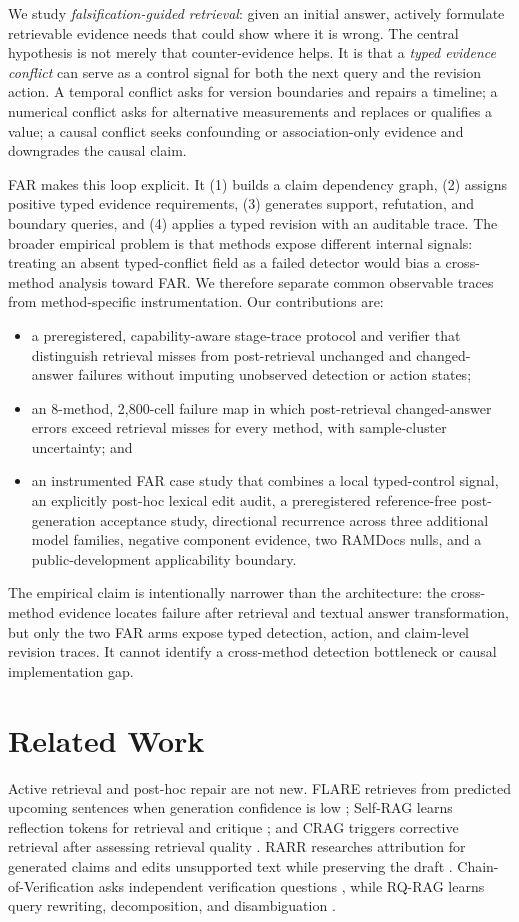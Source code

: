 \documentclass[letterpaper]{article}
\begin{document}
We study \emph{falsification-guided retrieval}: given an initial answer, actively formulate retrievable evidence needs that could show where it is wrong. The central hypothesis is not merely that counter-evidence helps. It is that a \emph{typed evidence conflict} can serve as a control signal for both the next query and the revision action. A temporal conflict asks for version boundaries and repairs a timeline; a numerical conflict asks for alternative measurements and replaces or qualifies a value; a causal conflict seeks confounding or association-only evidence and downgrades the causal claim.

FAR makes this loop explicit. It (1) builds a claim dependency graph, (2) assigns positive typed evidence requirements, (3) generates support, refutation, and boundary queries, and (4) applies a typed revision with an auditable trace. The broader empirical problem is that methods expose different internal signals: treating an absent typed-conflict field as a failed detector would bias a cross-method analysis toward FAR. We therefore separate common observable traces from method-specific instrumentation. Our contributions are:
\begin{itemize}
    \item a preregistered, capability-aware stage-trace protocol and verifier that distinguish retrieval misses from post-retrieval unchanged and changed-answer failures without imputing unobserved detection or action states;
    \item an 8-method, 2,800-cell failure map in which post-retrieval changed-answer errors exceed retrieval misses for every method, with sample-cluster uncertainty; and
    \item an instrumented FAR case study that combines a local typed-control signal, an explicitly post-hoc lexical edit audit, a preregistered reference-free post-generation acceptance study, directional recurrence across three additional model families, negative component evidence, two RAMDocs nulls, and a public-development applicability boundary.
\end{itemize}
The empirical claim is intentionally narrower than the architecture: the cross-method evidence locates failure after retrieval and textual answer transformation, but only the two FAR arms expose typed detection, action, and claim-level revision traces. It cannot identify a cross-method detection bottleneck or causal implementation gap.

\section{Related Work}
Active retrieval and post-hoc repair are not new. FLARE retrieves from predicted upcoming sentences when generation confidence is low \cite{jiang2023flare}; Self-RAG learns reflection tokens for retrieval and critique \cite{asai2024selfrag}; and CRAG triggers corrective retrieval after assessing retrieval quality \cite{yan2024crag}. RARR researches attribution for generated claims and edits unsupported text while preserving the draft \cite{gao2023rarr}. Chain-of-Verification asks independent verification questions \cite{dhuliawala2024cove}, while RQ-RAG learns query rewriting, decomposition, and disambiguation \cite{chan2024rqrag}.
\end{document}
